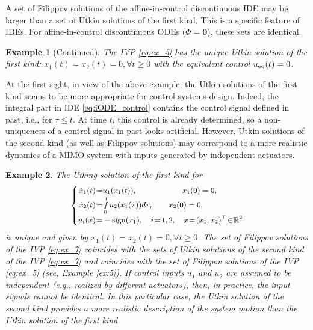 \documentclass{article}
\newcommand{\R}{\mathbb{R}}
\newcommand{\zero}{\mathbf{0}}
\newcommand{\sign}{\mathrm{sign}}
\newtheorem{example}{Example}
\begin{document}
  A set of Filippov solutions of the affine-in-control { discontinuous IDE} may be larger than a set of Utkin solutions of the first kind. This is a specific feature of IDEs. For affine-in-control discontinuous ODEs ($\Phi=\zero$), these sets are identical. 
\addtocounter{example}{-1}
\begin{example}[Continued]\itshape 
	The IVP \eqref{eq:ex_5} has the unique Utkin solution of the first kind: $x_1(t)=x_2(t)=0,\forall t\geq 0$ with the equivalent control $u_{\rm eq}(t)=0$. 
\end{example}

At the first sight, in view of the above example, the Utkin solutions of the first kind seems to be more appropriate 
for control systems design. Indeed, the integral part in IDE \eqref{eq:iODE_control} contains the control signal defined in past, i.e., for $\tau \leq t$. At time $t$,  this control is already determined, so a non-uniqueness of  a control signal in past  looks artificial. However,  Utkin solutions of the second kind (as well-as Filippov solutions) may correspond to a more realistic  dynamics of a MIMO system with  inputs generated by independent actuators.
 \begin{example}\itshape 
 The Utking solution of the first kind  for\vspace{-1mm}
\begin{equation}\label{eq:ex_7}\small
	\left\{
	\begin{split}
		\dot x_1(t)\!=&u_1(x_{1}(t)),  	\quad\quad\quad \quad\quad \;\;\; x_1(0)=0,\\[-1mm]
		\dot x_2(t)\!=&\smallint^t_{0} u_2(x_{1}(\tau)) d\tau, \quad\quad  x_2(0)=0,\\[-1mm]
		u_i(x)\!=&-\sign(x_1), \quad i\!=\!1,2, \quad x\!=\!(x_1,x_2)^{\top}\!\in\!\R^2
	\end{split}
	\right.\vspace{-1mm}
\end{equation}
is unique and given by $x_1(t)=x_2(t)=0,\forall t\geq 0$. 
The set of Filippov solutions of the IVP \eqref{eq:ex_7} 
coincides with the sets of Utkin solutions of the second kind of the IVP \eqref{eq:ex_7}  and 
coincides with the set of Filippov solutions of the IVP  \eqref{eq:ex_5} (see, Example \ref{ex:5}). If control inputs $u_1$
and $u_2$ are assumed to be independent (e.g., realized by different actuators), then, in practice, the input signals cannot be identical. In this particular case, the Utkin solution of the second kind provides a more realistic description of the system motion than  the Utkin solution of the first kind.
\end{example}
\end{document}
